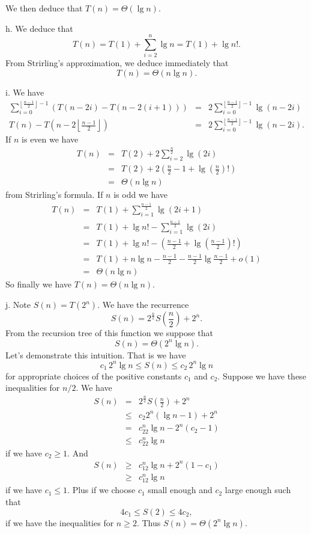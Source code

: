 \documentclass[a4paper,12pt]{article}
\newcommand{\subpar}[1]{\medskip \noindent #1.}
\begin{document}
We then deduce that $T(n) = \Theta(\lg n)$.

\subpar{h} We deduce that
\[ T(n) = T(1) + \sum_{i=2}^n \lg n = T(1) + \lg n!.\]
From Strirling's approximation, we deduce immediately that
\[ T(n) = \Theta(n\lg n).\]

\subpar{i}  We have
\begin{eqnarray*}
  \sum_{i=0}^{\left\lfloor\frac{n-1}{2}\right\rfloor -1 }(T(n-2i) -
  T(n-2(i+1))) &=&
  2\sum_{i=0}^{\left\lfloor\frac{n-1}{2}\right\rfloor-1}\lg(n-2i)
  \\ T(n) - T\left(n - 2\left\lfloor\frac{n-1}{2}\right\rfloor\right)
  &=& 2\sum_{i=0}^{\left\lfloor\frac{n-1}{2}\right\rfloor-1}\lg(n-2i).
\end{eqnarray*}
If $n$ is even we have
\begin{eqnarray*}
  T(n) &=& T(2) + 2 \sum_{i=2}^{\frac{n}{2}}\lg(2i) \\
  &=& T(2) + 2\left(\frac{n}{2} - 1 +
  \lg\left(\frac{n}{2}\right)!\right) \\
  &=& \Theta(n\lg n)
\end{eqnarray*}
from Strirling's formula. If $n$ is odd we have
\begin{eqnarray*}
  T(n) &=& T(1) + \sum_{i=1}^{\frac{n-1}{2}}\lg(2i+1) \\
  &=& T(1) + \lg n! - \sum_{i=1}^{\frac{n-1}{2}}\lg(2i) \\
  &=& T(1) + \lg n! - \left(\frac{n-1}{2} +
  \lg\left(\frac{n-1}{2}\right)!\right) \\
  &=& T(1) + n\lg n - \frac{n-1}{2} - \frac{n-1}{2}\lg\frac{n-1}{2} +
  o(1)  \\
  &=& \Theta(n\lg n)
\end{eqnarray*}
So finally we have $T(n) = \Theta(n\lg n)$.

\subpar{j}  Note $S(n) = T(2^n)$.  We have the recurrence
\[ S(n) = 2^{\frac{n}{2}}S\left(\frac{n}{2}\right) + 2^n.\]
From the recursion tree of this function we suppose that
\[ S(n) = \Theta(2^{n} \lg n).\]
Let's demonstrate this intuition.  That is we have
\[ c_1\,2^n\lg n \le S(n) \le c_2\,2^n\lg n\]
for appropriate choices of the positive constants $c_1$ and $c_2$.
Suppose we have these inequalities for $n/2$.  We have
\begin{eqnarray*}
  S(n) &=& 2^{\frac{n}{2}}S\left(\frac{n}{2}\right) + 2^n \\
  &\le& c_2 2^n(\lg n - 1) + 2^n \\
  &=& c_22^n\lg n- 2^n(c_2 - 1) \\
  &\le& c_22^n\lg n
\end{eqnarray*}
if we have $c_2 \ge 1$.  And
\begin{eqnarray*}
  S(n) &\ge& c_12^n\lg n + 2^n(1-c_1) \\
  &\ge& c_12^n\lg n
\end{eqnarray*}
if we have $c_1 \le 1$.  Plus if we choose $c_1$ small enough and
$c_2$ large enough such that
\[ 4c_1 \le S(2) \le 4c_2,\]
if we have the inequalities for $n \ge 2$.  Thus $S(n) = \Theta(2^n
\lg n)$.
\end{document}
